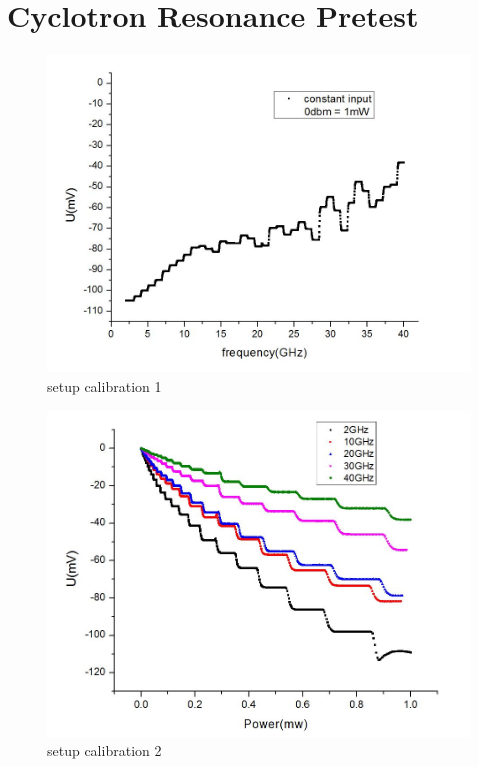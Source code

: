 \documentclass[12pt]{ruthesis}
\begin{document}
 
 
 
 
 
 

\section{Cyclotron Resonance Pretest}\label{Cyclotron}

\begin{figure}
  \centering
  \includegraphics[totalheight=8cm]{figures/spec.JPG}
  \caption{setup calibration 1}
  \label{spec}
\end{figure}
 

\begin{figure}
  \centering
  \includegraphics[totalheight=8cm]{figures/multifre.JPG}
  \caption{setup calibration 2}
  \label{multifre}
\end{figure}
 
\end{document}
